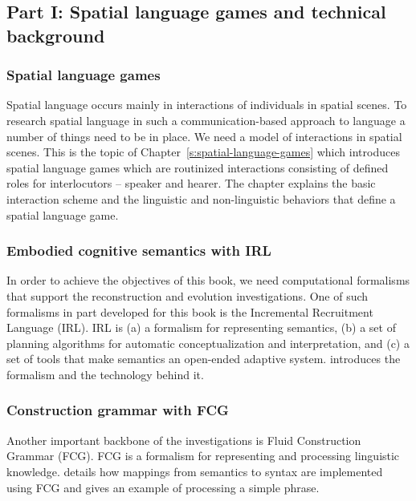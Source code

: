 \subsection{Part I: Spatial language games and technical background}
\subsubsection{Spatial language games}
Spatial language occurs mainly in interactions of individuals in spatial scenes.
To research spatial language in such a communication-based approach
to language a number of things need to be in place. We need a model of 
interactions in spatial scenes. This is the topic of Chapter~\ref{s:spatial-language-games} which 
introduces spatial language games which are routinized interactions
consisting of defined roles for interlocutors -- speaker and hearer. 
The chapter explains the basic interaction scheme and the 
linguistic and non-linguistic behaviors that define a spatial language
game. 

\subsubsection{Embodied cognitive semantics with IRL}
In order to achieve the objectives of this book, we need computational 
formalisms that support the reconstruction and evolution investigations. 
One of such formalisms in part developed for this book is the 
Incremental Recruitment Language (IRL). IRL is (a) a formalism
for representing semantics, (b) a set of planning algorithms for automatic
conceptualization and interpretation, and (c) a set of tools that make
semantics an open-ended adaptive system.  
introduces the formalism and the technology behind it.

\subsubsection{Construction grammar with FCG}
Another important backbone of the investigations is Fluid Construction 
Grammar (FCG). FCG is a formalism for representing and processing linguistic 
knowledge.  details how mappings from semantics to syntax 
are implemented using FCG and gives an example of processing a simple phrase.\enlargethispage{2\baselineskip}

